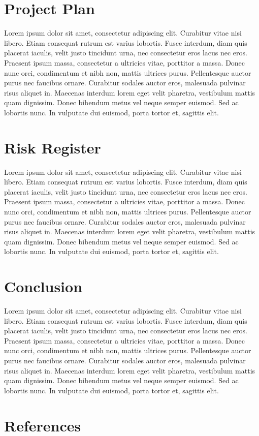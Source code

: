 \documentclass{article}
\begin{document}
\section{Project Plan}
Lorem ipsum dolor sit amet, consectetur adipiscing elit. Curabitur vitae nisi libero. Etiam consequat rutrum est varius lobortis. Fusce interdum, diam quis placerat iaculis, velit justo tincidunt urna, nec consectetur eros lacus nec eros. Praesent ipsum massa, consectetur a ultricies vitae, porttitor a massa. Donec nunc orci, condimentum et nibh non, mattis ultrices purus. Pellentesque auctor purus nec faucibus ornare. Curabitur sodales auctor eros, malesuada pulvinar risus aliquet in. Maecenas interdum lorem eget velit pharetra, vestibulum mattis quam dignissim. Donec bibendum metus vel neque semper euismod. Sed ac lobortis nunc. In vulputate dui euismod, porta tortor et, sagittis elit.

\section{Risk Register}
Lorem ipsum dolor sit amet, consectetur adipiscing elit. Curabitur vitae nisi libero. Etiam consequat rutrum est varius lobortis. Fusce interdum, diam quis placerat iaculis, velit justo tincidunt urna, nec consectetur eros lacus nec eros. Praesent ipsum massa, consectetur a ultricies vitae, porttitor a massa. Donec nunc orci, condimentum et nibh non, mattis ultrices purus. Pellentesque auctor purus nec faucibus ornare. Curabitur sodales auctor eros, malesuada pulvinar risus aliquet in. Maecenas interdum lorem eget velit pharetra, vestibulum mattis quam dignissim. Donec bibendum metus vel neque semper euismod. Sed ac lobortis nunc. In vulputate dui euismod, porta tortor et, sagittis elit.

\section{Conclusion}
Lorem ipsum dolor sit amet, consectetur adipiscing elit. Curabitur vitae nisi libero. Etiam consequat rutrum est varius lobortis. Fusce interdum, diam quis placerat iaculis, velit justo tincidunt urna, nec consectetur eros lacus nec eros. Praesent ipsum massa, consectetur a ultricies vitae, porttitor a massa. Donec nunc orci, condimentum et nibh non, mattis ultrices purus. Pellentesque auctor purus nec faucibus ornare. Curabitur sodales auctor eros, malesuada pulvinar risus aliquet in. Maecenas interdum lorem eget velit pharetra, vestibulum mattis quam dignissim. Donec bibendum metus vel neque semper euismod. Sed ac lobortis nunc. In vulputate dui euismod, porta tortor et, sagittis elit.

\section{References}
\end{document}
